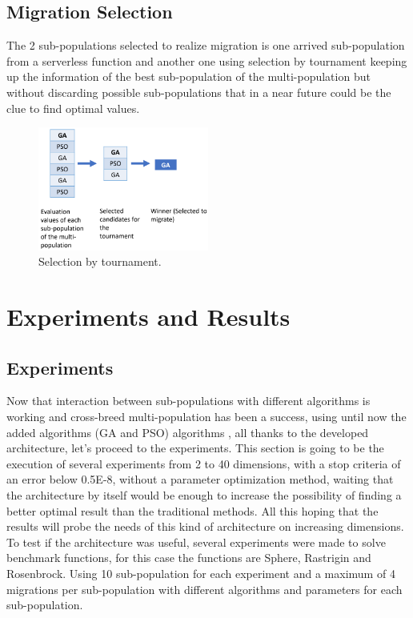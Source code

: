 \documentclass[runningheads]{llncs}
\begin{document}
  \subsection{Migration Selection} The 2 sub-populations selected to realize
  migration is one arrived sub-population from a serverless function and another
  one using selection by tournament keeping up the information of the best
  sub-population of the multi-population but without discarding possible
  sub-populations that in a near future could be the clue to find optimal
  values.

\begin{figure}[htp]
  \centering
  \includegraphics[width=0.5\textwidth]{img/selection.png}
  \caption{Selection by tournament.} \label{fig5}
  \end{figure}


  \section{Experiments and Results}
  \label{sec:exp}
  
\subsection{Experiments}
Now that interaction between sub-populations with different algorithms is
working and cross-breed multi-population has been a success, using until now the added
algorithms (GA and PSO) algorithms \cite{Kramer2017,Guerrero2017,Lalwani2019},
all thanks to the developed architecture, let's proceed to the experiments. This
section is going to be the execution of several experiments from 2 to 40
dimensions, with a stop criteria of an error below 0.5E-8, without a parameter
optimization method, waiting that the architecture by itself would be enough
to increase the possibility of finding a better optimal result than the traditional
methods. All this hoping that the results will probe %
the needs of this kind of
architecture on increasing dimensions. To test if the architecture was useful,
several experiments were made to solve benchmark functions, for this case the
functions are Sphere, Rastrigin and Rosenbrock. Using 10 sub-population for each
experiment and a maximum of 4 migrations per sub-population with different
algorithms and parameters for each sub-population.
\end{document}
